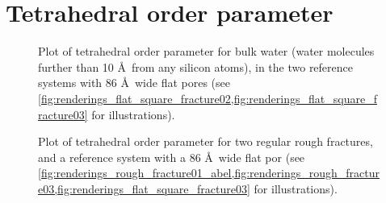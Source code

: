 \section{Tetrahedral order parameter}
%
%
\begin{figure}[htpb]%
    \centering%
    \caption{%
        Plot of tetrahedral order parameter for bulk water (water molecules further than 10 \AA\ from any silicon atoms), in the two reference systems with 86 \AA\ wide flat pores (see \cref{fig:renderings_flat_square_fracture02,fig:renderings_flat_square_fracture03} for illustrations).%
    }%
\end{figure}%
%
\begin{figure}[!p]%
    \centering%
    {
        \captionsetup{width=\textwidth} 
        \caption{%
            Plot of tetrahedral order parameter for two regular rough fractures, and a reference system with a 86 \AA\ wide flat por (see \cref{fig:renderings_rough_fracture01_abel,fig:renderings_rough_fracture03,fig:renderings_flat_square_fracture03} for illustrations).%
        }%
    }
\end{figure}%
